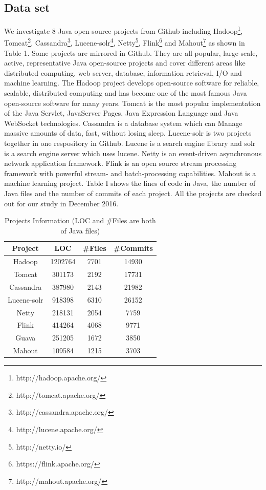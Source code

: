 \documentclass[conference]{IEEEtran}
\begin{document}
\subsection{Data set} We investigate 8 Java open-source projects from Github including Hadoop\footnote{http://hadoop.apache.org/}, Tomcat\footnote{http://tomcat.apache.org/}, Cassandra\footnote{http://cassandra.apache.org/}, Lucene-solr\footnote{http://lucene.apache.org/}, Netty\footnote{http://netty.io/}, Flink\footnote{https://flink.apache.org/} and Mahout\footnote{http://mahout.apache.org/} as shown in Table 1. Some projects are mirrored in Github. They are all popular, large-scale, active, representative Java open-source projects and cover different areas like distributed computing, web server, database, information retrieval, I/O and machine learning. The Hadoop project develops open-source software for reliable, scalable, distributed computing and has become one of the most famous Java open-source software for many years. Tomcat is the most popular implementation of the Java Servlet, JavaServer Pages, Java Expression Language and Java WebSocket technologies. Cassandra \cite{journals/sigops/LakshmanM10} is a database system which can Manage massive amounts of data, fast, without losing sleep. Lucene-solr is two projects together in one respository in Github. Lucene is a search engine library and solr is a search engine server which uses lucene. Netty is an event-driven asynchronous network application framework. Flink is an open source stream processing framework with powerful stream- and batch-processing capabilities. Mahout is a machine learning project. Table I shows the lines of code in Java, the number of Java files and the number of commits of each project. All the projects are checked out for our study in December 2016.

\begin{table}
	\centering
	\caption{Projects Information (LOC and \#Files are both of Java files)}
	\begin{tabular}{|c|c|c|c|}\hline
		Project&LOC&\#Files&\#Commits\\\hline
		Hadoop&1202764&7701&14930\\\hline
		Tomcat&301173&2192&17731\\\hline
		Cassandra&387980&2143&21982\\\hline
		Lucene-solr&918398&6310&26152\\\hline
		Netty&218131&2054&7759\\\hline
		Flink&414264&4068&9771\\\hline
		Guava&251205&1672&3850\\\hline
		Mahout&109584&1215&3703\\\hline
	\end{tabular}
\end{table}
\end{document}

